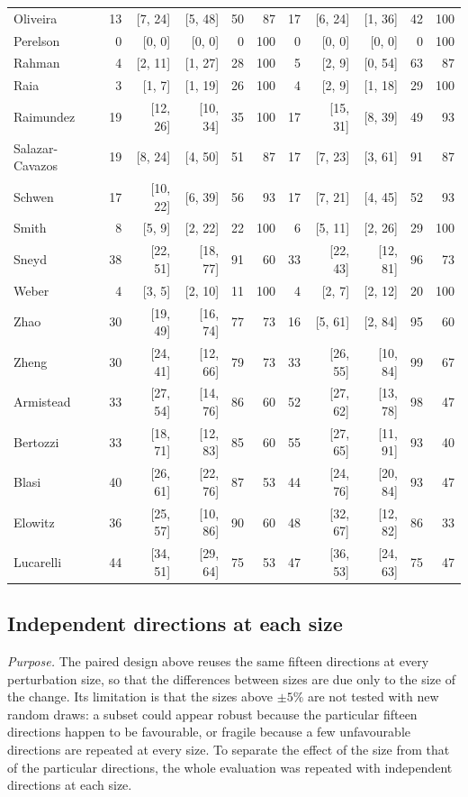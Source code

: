 {\begin{longtable}{@{}lrrrrrrrrrr@{}}
Oliveira & 13 & [7, 24] & [5, 48] & 50 & 87 & 17 & [6, 24] & [1, 36] & 42 & 100 \\
Perelson & 0 & [0, 0] & [0, 0] & 0 & 100 & 0 & [0, 0] & [0, 0] & 0 & 100 \\
Rahman & 4 & [2, 11] & [1, 27] & 28 & 100 & 5 & [2, 9] & [0, 54] & 63 & 87 \\
Raia & 3 & [1, 7] & [1, 19] & 26 & 100 & 4 & [2, 9] & [1, 18] & 29 & 100 \\
Raimundez & 19 & [12, 26] & [10, 34] & 35 & 100 & 17 & [15, 31] & [8, 39] & 49 & 93 \\
Salazar-Cavazos & 19 & [8, 24] & [4, 50] & 51 & 87 & 17 & [7, 23] & [3, 61] & 91 & 87 \\
Schwen & 17 & [10, 22] & [6, 39] & 56 & 93 & 17 & [7, 21] & [4, 45] & 52 & 93 \\
Smith & 8 & [5, 9] & [2, 22] & 22 & 100 & 6 & [5, 11] & [2, 26] & 29 & 100 \\
Sneyd & 38 & [22, 51] & [18, 77] & 91 & 60 & 33 & [22, 43] & [12, 81] & 96 & 73 \\
Weber & 4 & [3, 5] & [2, 10] & 11 & 100 & 4 & [2, 7] & [2, 12] & 20 & 100 \\
Zhao & 30 & [19, 49] & [16, 74] & 77 & 73 & 16 & [5, 61] & [2, 84] & 95 & 60 \\
Zheng & 30 & [24, 41] & [12, 66] & 79 & 73 & 33 & [26, 55] & [10, 84] & 99 & 67 \\
Armistead & 33 & [27, 54] & [14, 76] & 86 & 60 & 52 & [27, 62] & [13, 78] & 98 & 47 \\
Bertozzi & 33 & [18, 71] & [12, 83] & 85 & 60 & 55 & [27, 65] & [11, 91] & 93 & 40 \\
Blasi & 40 & [26, 61] & [22, 76] & 87 & 53 & 44 & [24, 76] & [20, 84] & 93 & 47 \\
Elowitz & 36 & [25, 57] & [10, 86] & 90 & 60 & 48 & [32, 67] & [12, 82] & 86 & 33 \\
Lucarelli & 44 & [34, 51] & [29, 64] & 75 & 53 & 47 & [36, 53] & [24, 63] & 75 & 47 \\
\bottomrule \end{longtable}}

\subsection*{Independent directions at each size}
\emph{Purpose.} The paired design above reuses the same fifteen directions at every perturbation size, so that the differences between sizes are due only to the size of the change. Its limitation is that the sizes above $\pm5\%$ are not tested with new random draws: a subset could appear robust because the particular fifteen directions happen to be favourable, or fragile because a few unfavourable directions are repeated at every size. To separate the effect of the size from that of the particular directions, the whole evaluation was repeated with independent directions at each size.

